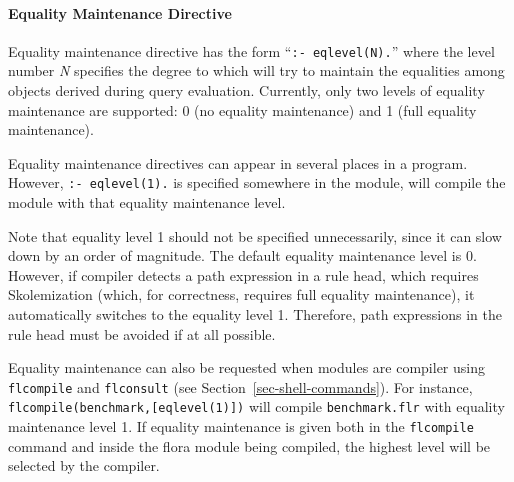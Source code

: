 \documentclass[11pt]{report}
\begin{document}
\paragraph{Equality Maintenance Directive} Equality maintenance directive has
the form ``{\tt :- eqlevel(N).}''  where the level number \emph{N}
specifies the degree to which \FLORA will try to maintain the equalities
among objects derived during query evaluation. Currently, only two levels
of equality maintenance are supported: 0 (no equality maintenance) and 1
(full equality maintenance).

Equality maintenance directives can appear in several places in a \FLORA
program. However, {\tt :- eqlevel(1).} is specified somewhere in the
module, \FLORA will compile the module with that equality maintenance
level.

Note that equality level 1 should not be specified unnecessarily, since it
can slow \FLORA down by an order of magnitude.  The default equality
maintenance level is 0. However, if \FLORA compiler detects a path
expression in a rule head, which requires Skolemization (which, for
correctness, requires full equality maintenance), it automatically switches
to the equality level 1.  Therefore, path expressions in the rule head must
be avoided if at all possible.

Equality maintenance can also be requested when \FLORA modules are compiler
using
{\tt flcompile} and {\tt flconsult} (see
Section~\ref{sec-shell-commands}). For instance, {\tt
  flcompile(benchmark,[eqlevel(1)])} will compile {\tt benchmark.flr} with
equality maintenance level 1.
If equality maintenance is given both in the {\tt flcompile} command and
inside the flora module being compiled, the highest level will be selected
by the compiler.

\end{document}
